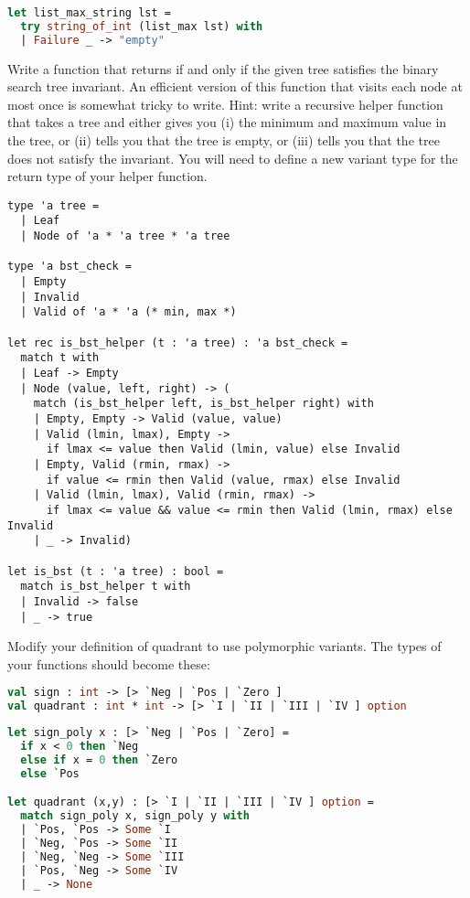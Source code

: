 \begin{lstlisting}[language=OCaml]
let list_max_string lst =
  try string_of_int (list_max lst) with
  | Failure _ -> "empty"
\end{lstlisting}

Write a function  that returns  if and only if the given tree satisfies the binary search tree invariant. An efficient version of this function that visits each node at most once is somewhat tricky to write. Hint: write a recursive helper function that takes a tree and either gives you (i) the minimum and maximum value in the tree, or (ii) tells you that the tree is empty, or (iii) tells you that the tree does not satisfy the invariant. You will need to define a new variant type for the return type of your helper function.

\begin{lstlisting}
type 'a tree =
  | Leaf
  | Node of 'a * 'a tree * 'a tree

type 'a bst_check =
  | Empty
  | Invalid
  | Valid of 'a * 'a (* min, max *)

let rec is_bst_helper (t : 'a tree) : 'a bst_check =
  match t with
  | Leaf -> Empty
  | Node (value, left, right) -> (
    match (is_bst_helper left, is_bst_helper right) with
    | Empty, Empty -> Valid (value, value)
    | Valid (lmin, lmax), Empty ->
      if lmax <= value then Valid (lmin, value) else Invalid
    | Empty, Valid (rmin, rmax) ->
      if value <= rmin then Valid (value, rmax) else Invalid
    | Valid (lmin, lmax), Valid (rmin, rmax) ->
      if lmax <= value && value <= rmin then Valid (lmin, rmax) else Invalid
    | _ -> Invalid)

let is_bst (t : 'a tree) : bool =
  match is_bst_helper t with
  | Invalid -> false
  | _ -> true
\end{lstlisting}

Modify your definition of quadrant to use polymorphic variants. The types of your functions should become these:
\begin{lstlisting}[language=OCaml]
val sign : int -> [> `Neg | `Pos | `Zero ]
val quadrant : int * int -> [> `I | `II | `III | `IV ] option
\end{lstlisting}

\begin{lstlisting}[language=OCaml]
let sign_poly x : [> `Neg | `Pos | `Zero] =
  if x < 0 then `Neg
  else if x = 0 then `Zero
  else `Pos

let quadrant (x,y) : [> `I | `II | `III | `IV ] option =
  match sign_poly x, sign_poly y with
  | `Pos, `Pos -> Some `I
  | `Neg, `Pos -> Some `II
  | `Neg, `Neg -> Some `III
  | `Pos, `Neg -> Some `IV
  | _ -> None
\end{lstlisting}


